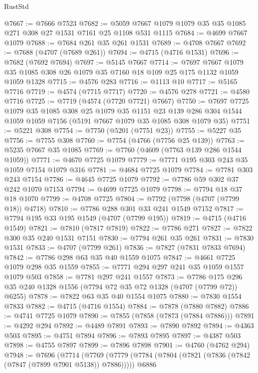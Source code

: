 \begin{lexlean}{RustStd}
\begin{coremodule}
{\begin{coremodule}
{{{{{{{{{{{{{{{{{{{{{{{{{{{{{{{{{{{@7667 := @7666 @7523
@7682 := @5059 @7667 @1079 @1079 @35 @35 @1085 @271 @308 @27 @1531 @7161 @25 @1108 @531 @1115
@7684 := @4699 @7667 @1079
@7688 := @7684 @261 @35 @261 @1531
@7689 := @4708 @7667
@7692 := @7688 (@4707 (@7689 @261))
@7694 := @4715 (@4716 @1531)
@7696 := @7682 (@7692 @7694)
@7697 := @5145 @7667
@7714 := @7697
    @7667
    @1079
    @35
    @1085
    @308
    @26
    @1079
    @35
    @7160
    @18
    @109
    @25
    @175
    @1132
    @1059
    @1059
    @1328
@7715 := @4576 @283
@7716 := @1113 @10
@7717 := @5165 @7716
@7719 := @4574 (@7715 @7717)
@7720 := @4576 @278
@7721 := @4580 @7716
@7725 := @7719 (@4574 (@7720 @7721) @7667)
@7750 := @7697
    @7725
    @1079
    @35
    @1085
    @308
    @25
    @1079
    @35
    @1151
    @23
    @139
    @286
    @304
    @1544
    @1059
    @1059
    @7156
    (@5191 @7667 @1079 @35 @1085 @308 @1079 @35)
@7751 := @5221 @308
@7754 := @7750 (@5201 (@7751 @23))
@7755 := @5227 @35
@7756 := @7755 @308
@7760 := @7754 (@4766 (@7756 @25 @139))
@7763 := @5235 @7667 @35 @1085
@7769 := @7760 (@4609 (@7763 @139 @286 @1544 @1059))
@7771 := @4670 @7725 @1079
@7779 := @7771 @195 @303 @243 @35 @1059 @7154 @1079 @316
@7781 := @4684 @7725 @1079
@7784 := @7781 @303 @243 @7154
@7786 := @4645 @7725 @1079
@7792 := @7786 @59 @302 @37 @242 @1070 @7153
@7794 := @4699 @7725 @1079
@7798 := @7794 @18 @37 @18 @1070
@7799 := @4708 @7725
@7804 := @7792 (@7798 (@4707 (@7799 @18)) @4718)
@7810 := @7786 @288 @301 @33 @241 @1549 @7152
@7817 := @7794 @195 @33 @195 @1549 (@4707 (@7799 @195))
@7819 := @4715 (@4716 @1549)
@7821 := @7810 (@7817 @7819)
@7822 := @7786 @271
@7827 := @7822 @300 @35 @240 @1531 @7151
@7830 := @7794 @261 @35 @261
@7831 := @7830 @1531
@7833 := @4707 (@7799 @261)
@7836 := @7827 (@7831 @7833 @7694)
@7842 := @7786 @298 @63 @35 @40 @1559 @1075
@7847 := @4661 @7725 @1079 @298 @35 @1559
@7855 := @7771 @294 @297 @241 @35 @1059 @1557 @1079 @503
@7858 := @7781 @297 @241 @1557
@7873 := @7786 @175 @296 @35 @240 @1328 @1556 (@7794 @72 @35 @72 @1328 (@4707 (@7799 @72)) @6255)
@7878 := @7822 @63 @35 @40 @1554 @1075
@7880 := @7830 @1554 @7833
@7882 := @4715 (@4716 @1554)
@7884 := @7878 (@7880 @7882)
@7886 := @4741 @7725 @1079
@7890 := @7855 (@7858 (@7873 (@7884 @7886)))
@7891 := @4292 @294
@7892 := @4489 @7891
@7893 := @7890 @7892
@7894 := @4363 @503
@7895 := @4751 @7894
@7896 := @7893 @7895
@7897 := @4387 @503
@7898 := @4755 @7897
@7899 := @7896 @7898
@7901 := @4760 (@4762 @294)
@7948 := @7696
    (@7714
      (@7769
        (@7779
          (@7784 (@7804 (@7821 (@7836 (@7842 (@7847 (@7899 @7901 @5138)) @7886)))))
          @6886
}}}}}}}}}}}}}}}}}}}}}}}}}}}}}}}}}}}
\end{coremodule}}
\end{coremodule}
\end{lexlean}
